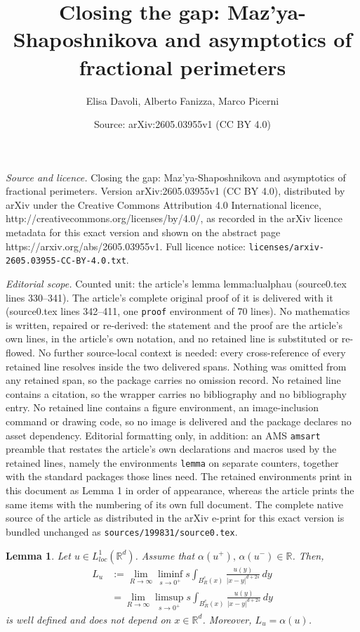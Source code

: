 \documentclass[10pt,a4paper]{amsart}
\title{Closing the gap: Maz'ya-Shaposhnikova and asymptotics of fractional perimeters}
\author{Elisa Davoli, Alberto Fanizza, Marco Picerni}
\date{Source: arXiv:2605.03955v1 (CC BY 4.0)}
\newtheorem{lemma}{Lemma}
\def\R{\mathbb{R}}
\newcommand{\abs}[1]{\left|#1\right|}
\begin{document}
\maketitle

\noindent\emph{Source and licence.} Closing the gap: Maz'ya-Shaposhnikova and asymptotics of fractional perimeters. Version arXiv:2605.03955v1 (CC BY 4.0), distributed by arXiv under the Creative Commons Attribution 4.0 International licence, http://creativecommons.org/licenses/by/4.0/, as recorded in the arXiv licence metadata for this exact version and shown on the abstract page https://arxiv.org/abs/2605.03955v1. Full licence notice: \texttt{licenses/arxiv-2605.03955-CC-BY-4.0.txt}.\par\smallskip

\noindent\textit{Editorial scope.} Counted unit: the article's lemma lemma:lualphau (source0.tex lines 330--341). The article's complete original proof of it is delivered with it (source0.tex lines 342--411, one \texttt{proof} environment of 70 lines). No mathematics is written, repaired or re-derived: the statement and the proof are the article's own lines, in the article's own notation, and no retained line is substituted or re-flowed.  No further source-local context is needed: every cross-reference of every retained line resolves inside the two delivered spans.  Nothing was omitted from any retained span, so the package carries no omission record.  No retained line contains a citation, so the wrapper carries no bibliography and no bibliography entry.  No retained line contains a figure environment, an image-inclusion command or drawing code, so no image is delivered and the package declares no asset dependency.  Editorial formatting only, in addition: an AMS \texttt{amsart} preamble that restates the article's own declarations and macros used by the retained lines, namely the environments \texttt{lemma} on separate counters, together with the standard packages those lines need.  The retained environments print in this document as Lemma 1 in order of appearance, whereas the article prints the same items with the numbering of its own full document.  The complete native source of the article as distributed in the arXiv e-print for this exact version is bundled unchanged as \texttt{sources/199831/source0.tex}.
\begin{lemma}
    \label{lemma:lualphau}
    Let $u\in L^1_{loc}(\R^d)$. Assume that $\alpha(u^+),\,\alpha(u^-)\in \R$. Then,
    \begin{equation}
        \label{luwelldefined}
        \begin{split}
             L_u&:=\lim_{R\to\infty}\liminf_{s\to 0^+}s\int_{B_R^c(x)}\frac{u(y)}{\abs{x-y}^{d+2s}}\,dy\\
             &=\lim_{R\to\infty}\limsup_{s\to 0^+}s\int_{B_R^c(x)}\frac{u(y)}{\abs{x-y}^{d+2s}}\,dy
        \end{split}
    \end{equation}
    is well defined and does not depend on $x\in\R^d$. Moreover, $L_u=\alpha(u)$.
\end{lemma}
\end{document}
